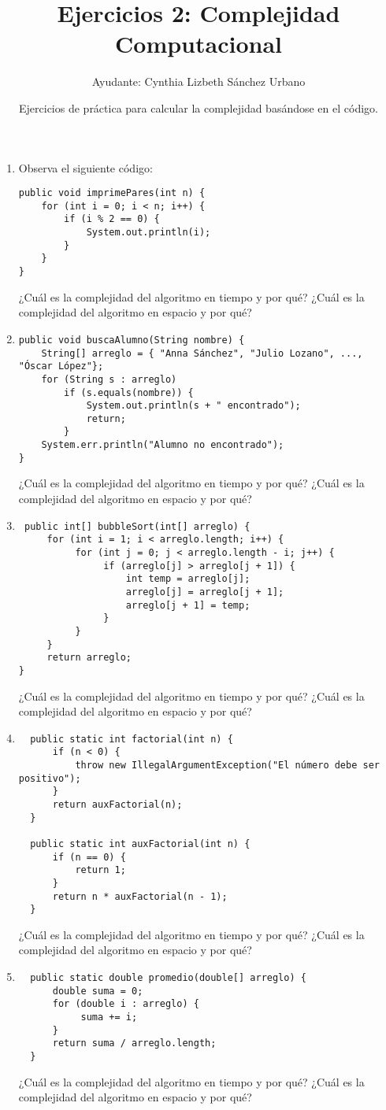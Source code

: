 \documentclass[12pt]{article} %
\begin{document}
\title{Ejercicios 2: Complejidad Computacional}
\author{Ayudante: Cynthia Lizbeth Sánchez Urbano}
\date{Ejercicios de práctica para calcular la complejidad basándose en el código.}
\maketitle
\begin{enumerate}
\item Observa el siguiente código:
\begin{lstlisting}
public void imprimePares(int n) {
    for (int i = 0; i < n; i++) {
        if (i % 2 == 0) {
            System.out.println(i);
        }
    }
}
\end{lstlisting}
¿Cuál es la complejidad del algoritmo en tiempo y por qué?
¿Cuál es la complejidad del algoritmo en espacio y por qué?
\item
\begin{lstlisting}
public void buscaAlumno(String nombre) {
    String[] arreglo = { "Anna Sánchez", "Julio Lozano", ..., "Óscar López"};
    for (String s : arreglo)
        if (s.equals(nombre)) {
            System.out.println(s + " encontrado");
            return;
        }
    System.err.println("Alumno no encontrado");
}
\end{lstlisting}
¿Cuál es la complejidad del algoritmo en tiempo y por qué?
¿Cuál es la complejidad del algoritmo en espacio y por qué?
\item
\begin{lstlisting}
 public int[] bubbleSort(int[] arreglo) {
     for (int i = 1; i < arreglo.length; i++) {
          for (int j = 0; j < arreglo.length - i; j++) {
               if (arreglo[j] > arreglo[j + 1]) {
                   int temp = arreglo[j];
                   arreglo[j] = arreglo[j + 1];
                   arreglo[j + 1] = temp;
               }
          }
     }
     return arreglo;
}
\end{lstlisting}
¿Cuál es la complejidad del algoritmo en tiempo y por qué?
¿Cuál es la complejidad del algoritmo en espacio y por qué?
\item 
\begin{lstlisting}
  public static int factorial(int n) {
      if (n < 0) {
          throw new IllegalArgumentException("El número debe ser positivo");
      }
      return auxFactorial(n);
  }

  public static int auxFactorial(int n) {
      if (n == 0) {
          return 1;
      }
      return n * auxFactorial(n - 1);
  }
\end{lstlisting}
¿Cuál es la complejidad del algoritmo en tiempo y por qué?
¿Cuál es la complejidad del algoritmo en espacio y por qué?
\item
\begin{lstlisting}
  public static double promedio(double[] arreglo) {
      double suma = 0;
      for (double i : arreglo) {
           suma += i;
      }
      return suma / arreglo.length;
  }
\end{lstlisting}
¿Cuál es la complejidad del algoritmo en tiempo y por qué?
¿Cuál es la complejidad del algoritmo en espacio y por qué?
\end{enumerate}
\end{document}
